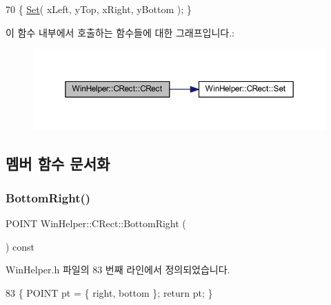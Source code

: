\begin{DoxyCode}
70 \{ \mbox{\hyperlink{class_win_helper_1_1_c_rect_a5cc306b936afd8a1fe8321a7846ad260}{Set}}( xLeft, yTop, xRight, yBottom ); \}
\end{DoxyCode}
이 함수 내부에서 호출하는 함수들에 대한 그래프입니다.\+:
\nopagebreak
\begin{figure}[H]
\begin{center}
\leavevmode
\includegraphics[width=350pt]{class_win_helper_1_1_c_rect_a3253ffe9a6b650c58100509712805d30_cgraph}
\end{center}
\end{figure}


\subsection{멤버 함수 문서화}
\mbox{\label{class_win_helper_1_1_c_rect_a5484884c667466060e54d20f566376a6}} 
\subsubsection{\texorpdfstring{Bottom\+Right()}{BottomRight()}}
{\footnotesize\ttfamily P\+O\+I\+NT Win\+Helper\+::\+C\+Rect\+::\+Bottom\+Right (\begin{DoxyParamCaption}{ }\end{DoxyParamCaption}) const\hspace{0.3cm}{\ttfamily [inline]}}



Win\+Helper.\+h 파일의 83 번째 라인에서 정의되었습니다.


\begin{DoxyCode}
83 \{ POINT pt = \{ right, bottom \}; \textcolor{keywordflow}{return} pt; \}   
\end{DoxyCode}
\mbox{\label{class_win_helper_1_1_c_rect_a15109200bd331bfcfa7bc7bfd86c2c52}} 
